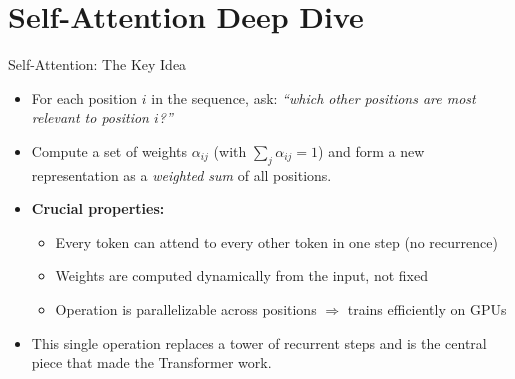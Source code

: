 \documentclass[10pt,english,aspectratio=169]{beamer}
\begin{document}
\section{Self-Attention Deep Dive}

\begin{frame}{Self-Attention: The Key Idea}
\begin{itemize}
\item For each position $i$ in the sequence, ask: \emph{``which other positions are most relevant to position $i$?''}

\medskip
\item Compute a set of weights $\alpha_{ij}$ (with $\sum_j \alpha_{ij}=1$) and form a new representation as a \emph{weighted sum} of all positions.

\medskip
\item \textbf{Crucial properties:}
\begin{itemize}
    \item Every token can attend to every other token in one step (no recurrence)
    \item Weights are computed dynamically from the input, not fixed
    \item Operation is parallelizable across positions $\Rightarrow$ trains efficiently on GPUs
\end{itemize}

\medskip
\item This single operation replaces a tower of recurrent steps and is the central piece that made the Transformer work.
\end{itemize}
\end{frame}
\end{document}
